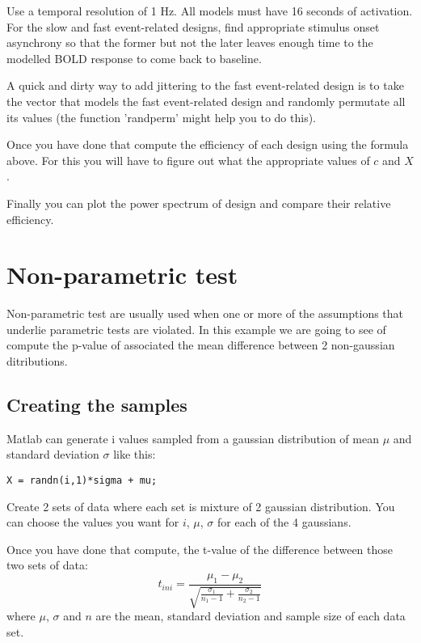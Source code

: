 \documentclass[a4paper,10pt]{article}
\begin{document}
Use a temporal resolution of 1 Hz. All models must have 16 seconds of activation. For the slow and fast event-related designs, find appropriate stimulus onset asynchrony so that the former but not the later leaves enough time to the modelled BOLD response to come back to baseline.

A quick and dirty way to add jittering to the fast event-related design is to take the vector that models the fast event-related design and randomly permutate all its values (the function 'randperm' might help you to do this).

Once you have done that compute the efficiency of each design using the formula above. For this you will have to figure out what the appropriate values of $c$ and $X$.

Finally you can plot the power spectrum of design and compare their relative efficiency.




\section{Non-parametric test}

Non-parametric test are usually used when one or more of the assumptions that underlie parametric tests are violated. In this example we are going to see of compute the p-value of associated the mean difference between 2 non-gaussian ditributions.


\subsection{Creating the samples}

Matlab can generate i values sampled from a gaussian distribution of mean $\mu$ and standard deviation $\sigma$ like this:
\begin{verbatim}
X = randn(i,1)*sigma + mu;
\end{verbatim}

Create 2 sets of data where each set is mixture of 2 gaussian distribution. You can choose the values you want for $i$, $\mu$, $\sigma$ for each of the 4 gaussians.

Once you have done that compute, the t-value of the difference between those two sets of data:
\begin{displaymath}
t_{ini} = \frac{\mu_{1} - \mu_{2}} {\sqrt{ \frac{\sigma_{1}} {n_{1}-1} + \frac{\sigma_{2}} {n_{2}-1} }}
\end{displaymath}
where $\mu$, $\sigma$ and $n$ are the mean, standard deviation and sample size of each data set.
\end{document}
